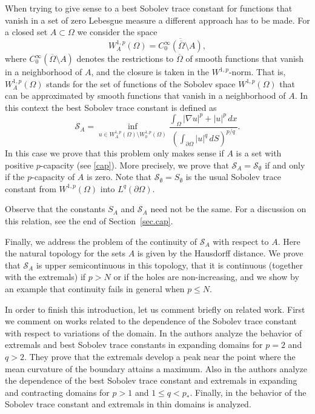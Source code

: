 \documentclass[11pt]{amsart}
\theoremstyle{remark}
\numberwithin{equation}{section}
\newcommand{\cS}{\mathcal{S}}
\begin{document}
When trying to give sense to a best Sobolev trace constant for functions that vanish in a set of zero Lebesgue measure a different approach has to be made. For a closed set $A\subset\Omega$ we consider the space
\begin{equation}\label{WA}
W^{1,p}_A(\Omega)=\overline{C^\infty_0(\overline\Omega\setminus A)},
\end{equation}
where $C^\infty_0(\overline\Omega\setminus A)$ denotes the restrictions to $\overline\Omega$ of smooth functions that vanish in a neighborhood of $A$, and the closure is taken in the $W^{1,p}$-norm. That is, $W^{1,p}_A(\Omega)$ stands for the set of functions of the Sobolev space $W^{1,p}(\Omega)$ that can be approximated by smooth functions that vanish in a neighborhood of $A$. In this context the best Sobolev trace constant is defined as
\begin{equation}\label{cSA}
\cS_A=\inf_{u\in W^{1,p}_A(\Omega)\setminus W^{1,p}_0(\Omega)}\frac{\int_\Omega|\nabla u|^p+|u|^p\,dx}{\left(\int_{\partial\Omega}|u|^q\,dS\right)^{p/q}}.
\end{equation}
In this case we prove that this problem only makes sense if $A$ is a set with positive $p$-capacity (see \eqref{cap}). More precisely, we prove that $\cS_A=\cS_\emptyset$ if and only if the $p$-capacity of $A$ is zero. Note that $\cS_\emptyset=S_\emptyset$ is the usual Sobolev trace constant from $W^{1,p}(\Omega)$ into $L^q(\partial\Omega)$.

Observe that the constants $S_A$ and $\cS_A$ need not be the same. For a discussion on this relation, see the end of Section~\ref{sec.cap}.

Finally, we address the problem of the continuity of $\cS_A$ with respect to $A$. Here the natural topology for the sets $A$ is given by the Hausdorff distance. We prove that $\cS_A$ is upper semicontinuous in this topology, that it is continuous (together with the extremals) if $p>N$ or if the holes are non-increasing, and we show by an example that continuity fails in general when $p\le N$.

In order to finish this introduction, let us comment briefly on related work. First we comment on works related to the dependence of the Sobolev trace constant with respect to variations of the domain. In \cite{dPF} the authors analyze the behavior of extremals and best Sobolev trace constants in expanding domains for $p=2$ and $q>2$. They prove that the extremals develop a peak near the point where the mean curvature of the boundary attains a maximum. Also in \cite{FBR2} the authors analyze the dependence of the best Sobolev trace constant and extremals in expanding and contracting domains for $p>1$ and $1\le q<p_*$. Finally, in \cite{FBMR} the behavior of the Sobolev trace constant and extremals in thin domains is analyzed.
\end{document}
